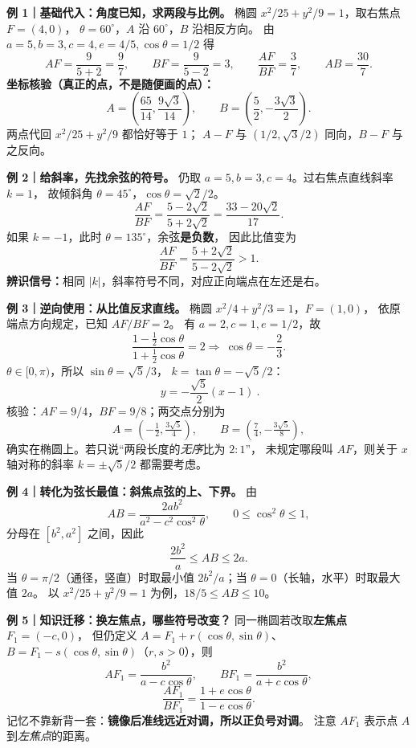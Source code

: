 \begin{examplebox}
\textbf{例 1｜基础代入：角度已知，求两段与比例。}
椭圆 $x^2/25+y^2/9=1$，取右焦点 $F=(4,0)$，
$\theta=60^\circ$，$A$ 沿 $60^\circ$，$B$ 沿相反方向。
由 $a=5,b=3,c=4,e=4/5,\cos\theta=1/2$ 得
\[
 AF=\frac9{5+2}=\frac97,\qquad
 BF=\frac9{5-2}=3,\qquad
 \boxed{\frac{AF}{BF}=\frac37},\qquad
 \boxed{AB=\frac{30}{7}}.
\]
\textbf{坐标核验（真正的点，不是随便画的点）：}
\[
 A=\left(\frac{65}{14},\frac{9\sqrt3}{14}\right),\qquad
 B=\left(\frac52,-\frac{3\sqrt3}{2}\right).
\]
两点代回 $x^2/25+y^2/9$ 都恰好等于 $1$；
$A-F$ 与 $(1/2,\sqrt3/2)$ 同向，$B-F$ 与之反向。
\end{examplebox}

\begin{examplebox}
\textbf{例 2｜给斜率，先找余弦的符号。}
仍取 $a=5,b=3,c=4$。过右焦点直线斜率 $k=1$，
故倾斜角 $\theta=45^\circ$，$\cos\theta=\sqrt2/2$。
\[
 \boxed{\frac{AF}{BF}
 =\frac{5-2\sqrt2}{5+2\sqrt2}
 =\frac{33-20\sqrt2}{17}}.
\]
如果 $k=-1$，此时 $\theta=135^\circ$，余弦\textbf{是负数}，
因此比值变为
\[
 \boxed{\frac{AF}{BF}=\frac{5+2\sqrt2}{5-2\sqrt2}>1}.
\]
\textbf{辨识信号：}相同 $|k|$，斜率符号不同，对应正向端点在左还是右。
\end{examplebox}

\begin{examplebox}
\textbf{例 3｜逆向使用：从比值反求直线。}
椭圆 $x^2/4+y^2/3=1$，$F=(1,0)$，
依原端点方向规定，已知 $AF/BF=2$。
有 $a=2,c=1,e=1/2$，故
\[
 \frac{1-\tfrac12\cos\theta}{1+\tfrac12\cos\theta}=2
 \Longrightarrow\ \cos\theta=-\frac23.
\]
$\theta\in[0,\pi)$，所以 $\sin\theta=\sqrt5/3$，
$k=\tan\theta=-\sqrt5/2$：
\[
 \boxed{\ y=-\frac{\sqrt5}{2}(x-1)\ }.
\]
核验：$AF=9/4$，$BF=9/8$；两交点分别为
\[
 A=\left(-\tfrac12,\tfrac{3\sqrt5}{4}\right),\qquad
 B=\left(\tfrac74,-\tfrac{3\sqrt5}{8}\right),
\]
确实在椭圆上。若只说``两段长度的\emph{无序}比为 $2:1$''，
未规定哪段叫 $AF$，则关于 $x$ 轴对称的斜率
$k=\pm\sqrt5/2$ 都需要考虑。
\end{examplebox}

\begin{examplebox}
\textbf{例 4｜转化为弦长最值：斜焦点弦的上、下界。}
由
\[
 AB=\frac{2ab^2}{a^2-c^2\cos^2\theta},\qquad
 0\le \cos^2\theta\le1,
\]
分母在 $[b^2,a^2]$ 之间，因此
\[
 \boxed{\frac{2b^2}{a}\le AB\le2a}.
\]
当 $\theta=\pi/2$（通径，竖直）时取最小值
$2b^2/a$；当 $\theta=0$（长轴，水平）时取最大值 $2a$。
以 $x^2/25+y^2/9=1$ 为例，$\boxed{18/5\le AB\le10}$。
\end{examplebox}

\begin{examplebox}
\textbf{例 5｜知识迁移：换左焦点，哪些符号改变？}
同一椭圆若改取\textbf{左焦点} $F_1=(-c,0)$，
但仍定义 $A=F_1+r(\cos\theta,\sin\theta)$、
$B=F_1-s(\cos\theta,\sin\theta)$（$r,s>0$），则
\[
 \boxed{AF_1=\frac{b^2}{a-c\cos\theta}},\qquad
 \boxed{BF_1=\frac{b^2}{a+c\cos\theta}},
\]
\[
 \boxed{\frac{AF_1}{BF_1}=\frac{1+e\cos\theta}{1-e\cos\theta}}.
\]
记忆不靠新背一套：\textbf{镜像后准线远近对调，所以正负号对调}。
注意 $AF_1$ 表示点 $A$ 到\emph{左焦点}的距离。
\end{examplebox}
